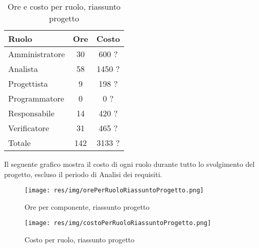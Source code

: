 \begin{table}[H]
	\centering
	\begin{tabular}{ l c c }
		\textbf{Ruolo} & \textbf{Ore} & \textbf{Costo} \\
		\hline
		Amministratore & 30 & 600 ? \\
		Analista & 58 & 1450 ? \\
		Progettista & 9 & 198 ? \\
		Programmatore & 0 & 0 ? \\
		Responsabile & 14 & 420 ? \\
		Verificatore & 31 & 465 ? \\
		\hline
		Totale & 142 & 3133 ? \\
		\hline
	\end{tabular}
	\caption{Ore e costo per ruolo, riassunto progetto}
\end{table}

Il seguente grafico mostra il costo di ogni ruolo durante tutto lo svolgimento del progetto, escluso il periodo di Analisi dei requisiti.

\begin{figure}[H]
  \begin{center}
    \texttt{[image: res/img/orePerRuoloRiassuntoProgetto.png]}
  \caption{Ore per componente, riassunto progetto}
  \end{center} 
\end{figure}  

\begin{figure}[H]
  \begin{center}
    \texttt{[image: res/img/costoPerRuoloRiassuntoProgetto.png]}
  \caption{Costo per ruolo, riassunto progetto}
  \end{center} 
\end{figure}  


